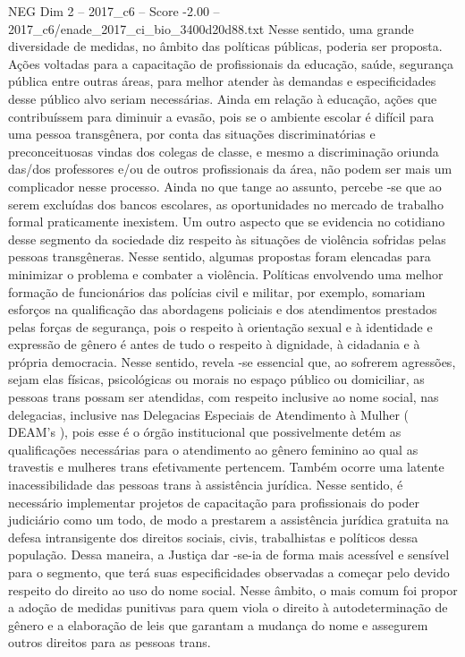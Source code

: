\begin{textsample}{NEG Dim 2 – 2017\_c6 – Score -2.00 – 2017\_c6/enade\_2017\_ci\_bio\_3400d20d88.txt}
Nesse sentido, uma grande diversidade de medidas, no âmbito das políticas públicas, poderia ser proposta.
Ações voltadas para a capacitação de profissionais da educação, saúde, segurança pública entre outras áreas, para melhor atender às demandas e especificidades desse público alvo seriam necessárias.
Ainda em relação à educação, ações que contribuíssem para diminuir a evasão, pois se o ambiente escolar é difícil para uma pessoa transgênera, por conta das situações discriminatórias e preconceituosas vindas dos colegas de classe, e mesmo a discriminação oriunda das/dos professores e/ou de outros profissionais da área, não podem ser mais um complicador nesse processo.
Ainda no que tange ao assunto, percebe -se que ao serem excluídas dos bancos escolares, as oportunidades no mercado de trabalho formal praticamente inexistem.
Um outro aspecto que se evidencia no cotidiano desse segmento da sociedade diz respeito às situações de violência sofridas pelas pessoas transgêneras.
Nesse sentido, algumas propostas foram elencadas para minimizar o problema e combater a violência.
Políticas envolvendo uma melhor formação de funcionários das polícias civil e militar, por exemplo, somariam esforços na qualificação das abordagens policiais e dos atendimentos prestados pelas forças de segurança, pois o respeito à orientação sexual e à identidade e expressão de gênero é antes de tudo o respeito à dignidade, à cidadania e à própria democracia.
Nesse sentido, revela -se essencial que, ao sofrerem agressões, sejam elas físicas, psicológicas ou morais no espaço público ou domiciliar, as pessoas trans possam ser atendidas, com respeito inclusive ao nome social, nas delegacias, inclusive nas Delegacias Especiais de Atendimento à Mulher ( DEAM’s ), pois esse é o órgão institucional que possivelmente detém as qualificações necessárias para o atendimento ao gênero feminino ao qual as travestis e mulheres trans efetivamente pertencem.
Também ocorre uma latente inacessibilidade das pessoas trans à assistência jurídica.
Nesse sentido, é necessário implementar projetos de capacitação para profissionais do poder judiciário como um todo, de modo a prestarem a assistência jurídica gratuita na defesa intransigente dos direitos sociais, civis, trabalhistas e políticos dessa população.
Dessa maneira, a Justiça dar -se-ia de forma mais acessível e sensível para o segmento, que terá suas especificidades observadas a começar pelo devido respeito do direito ao uso do nome social.
Nesse âmbito, o mais comum foi propor a adoção de medidas punitivas para quem viola o direito à autodeterminação de gênero e a elaboração de leis que garantam a mudança do nome e assegurem outros direitos para as pessoas trans.

\end{textsample}
